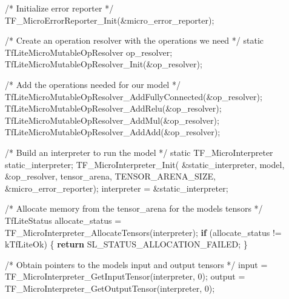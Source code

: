 \documentclass[
  9pt,
  letterpaper,
  abstract,
  titlepage]{scrbook}
\newenvironment{Shaded}{\begin{snugshade}}{\end{snugshade}}
\newcommand{\CommentTok}[1]{\textcolor[rgb]{0.37,0.37,0.37}{#1}}
\newcommand{\ControlFlowTok}[1]{\textcolor[rgb]{0.00,0.23,0.31}{\textbf{#1}}}
\newcommand{\DataTypeTok}[1]{\textcolor[rgb]{0.68,0.00,0.00}{#1}}
\newcommand{\DecValTok}[1]{\textcolor[rgb]{0.68,0.00,0.00}{#1}}
\newcommand{\NormalTok}[1]{\textcolor[rgb]{0.00,0.23,0.31}{#1}}
\newcommand{\OperatorTok}[1]{\textcolor[rgb]{0.37,0.37,0.37}{#1}}
\begin{document}
\begin{Shaded}
\begin{Highlighting}[]
  \CommentTok{/* Initialize error reporter */}
\NormalTok{  TF\_MicroErrorReporter\_Init}\OperatorTok{(\&}\NormalTok{micro\_error\_reporter}\OperatorTok{);}

  \CommentTok{/* Create an operation resolver with the operations we need */}
  \DataTypeTok{static}\NormalTok{ TfLiteMicroMutableOpResolver op\_resolver}\OperatorTok{;}
\NormalTok{  TfLiteMicroMutableOpResolver\_Init}\OperatorTok{(\&}\NormalTok{op\_resolver}\OperatorTok{);}
  
  \CommentTok{/* Add the operations needed for our model */}
\NormalTok{  TfLiteMicroMutableOpResolver\_AddFullyConnected}\OperatorTok{(\&}\NormalTok{op\_resolver}\OperatorTok{);}
\NormalTok{  TfLiteMicroMutableOpResolver\_AddRelu}\OperatorTok{(\&}\NormalTok{op\_resolver}\OperatorTok{);}
\NormalTok{  TfLiteMicroMutableOpResolver\_AddMul}\OperatorTok{(\&}\NormalTok{op\_resolver}\OperatorTok{);}
\NormalTok{  TfLiteMicroMutableOpResolver\_AddAdd}\OperatorTok{(\&}\NormalTok{op\_resolver}\OperatorTok{);}

  \CommentTok{/* Build an interpreter to run the model */}
  \DataTypeTok{static}\NormalTok{ TF\_MicroInterpreter static\_interpreter}\OperatorTok{;}
\NormalTok{  TF\_MicroInterpreter\_Init}\OperatorTok{(}
      \OperatorTok{\&}\NormalTok{static\_interpreter}\OperatorTok{,}\NormalTok{ model}\OperatorTok{,} \OperatorTok{\&}\NormalTok{op\_resolver}\OperatorTok{,}\NormalTok{ tensor\_arena}\OperatorTok{,} 
\NormalTok{      TENSOR\_ARENA\_SIZE}\OperatorTok{,} \OperatorTok{\&}\NormalTok{micro\_error\_reporter}\OperatorTok{);}
\NormalTok{  interpreter }\OperatorTok{=} \OperatorTok{\&}\NormalTok{static\_interpreter}\OperatorTok{;}

  \CommentTok{/* Allocate memory from the tensor\_arena for the model\textquotesingle{}s tensors */}
\NormalTok{  TfLiteStatus allocate\_status }\OperatorTok{=}\NormalTok{ TF\_MicroInterpreter\_AllocateTensors}\OperatorTok{(}\NormalTok{interpreter}\OperatorTok{);}
  \ControlFlowTok{if} \OperatorTok{(}\NormalTok{allocate\_status }\OperatorTok{!=}\NormalTok{ kTfLiteOk}\OperatorTok{)} \OperatorTok{\{}
    \ControlFlowTok{return}\NormalTok{ SL\_STATUS\_ALLOCATION\_FAILED}\OperatorTok{;}
  \OperatorTok{\}}

  \CommentTok{/* Obtain pointers to the model\textquotesingle{}s input and output tensors */}
\NormalTok{  input }\OperatorTok{=}\NormalTok{ TF\_MicroInterpreter\_GetInputTensor}\OperatorTok{(}\NormalTok{interpreter}\OperatorTok{,} \DecValTok{0}\OperatorTok{);}
\NormalTok{  output }\OperatorTok{=}\NormalTok{ TF\_MicroInterpreter\_GetOutputTensor}\OperatorTok{(}\NormalTok{interpreter}\OperatorTok{,} \DecValTok{0}\OperatorTok{);}
  

\end{Highlighting}
\end{Shaded}
\end{document}
